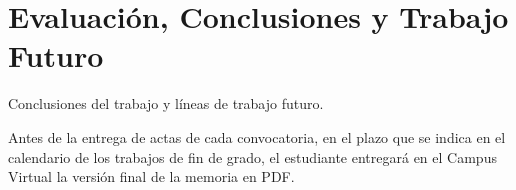 \chapter{Evaluación, Conclusiones y Trabajo Futuro}
\label{cap:conclusiones}

Conclusiones del trabajo y líneas de trabajo futuro.

Antes de la entrega de actas de cada convocatoria, en el plazo que se indica en el calendario de los trabajos de fin de grado, el estudiante entregará en el Campus Virtual la versión final de la memoria en PDF.


